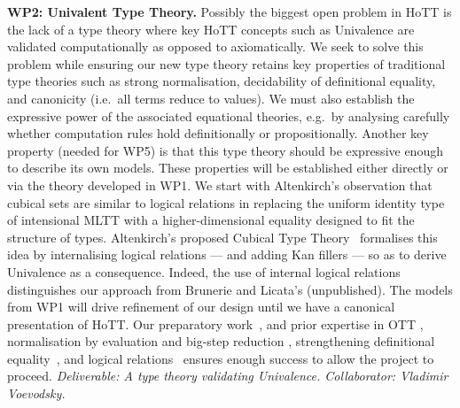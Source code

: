 \documentclass[a4paper,11pt]{article}
\begin{document}
{\bf WP2: Univalent Type Theory.}  Possibly the biggest open problem
in HoTT is the lack of a type theory where key HoTT concepts such as
Univalence are validated computationally as opposed to
axiomatically. We seek to solve this problem while ensuring our new type theory retains key
properties of traditional type theories such as strong normalisation,
decidability of definitional equality, and canonicity ({i.e.}~all
terms reduce to values). We must also establish the expressive power
of the associated equational theories, {e.g.}~by analysing carefully
whether computation rules hold definitionally or
propositionally. Another key property (needed for WP5) is that this
type theory should be expressive enough to describe its own
models. These properties will be established either directly or via
the theory developed in WP1. We start with Altenkirch's observation
\cite{txa-ihp14} that cubical sets are similar to 
logical relations in replacing the uniform identity type of
intensional MLTT with a higher-dimensional equality designed to fit
the structure of types. Altenkirch's proposed Cubical Type
Theory~\cite{alti-ctt} formalises this idea by internalising logical
relations --- and adding Kan fillers --- so as to derive Univalence as
a consequence. Indeed, the use of internal logical relations
distinguishes our approach from Brunerie and Licata's (unpublished).
The models from WP1 will drive refinement of our design until we have
a canonical presentation of HoTT. Our preparatory
work~\cite{txa-ihp14,alti-ctt}, and prior expertise in OTT
\cite{alti:ott-conf}, normalisation by evaluation and big-step
reduction \cite{alti:lics96}, strengthening definitional
equality~\cite{Allais:2013:NEN:2502409.2502411}, and logical
relations~\cite{neil2014relParamDep} ensures enough success to allow
the project to proceed.  {\em Deliverable: A type theory validating
  Univalence.  Collaborator: Vladimir Voevodsky.  }
\end{document}

